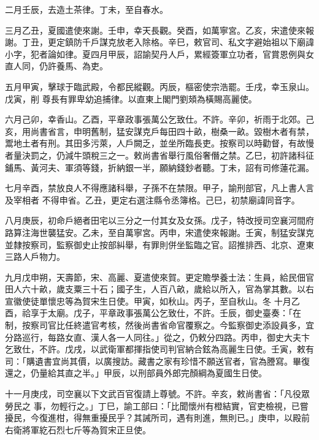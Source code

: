 \begin{pinyinscope}
 二月壬辰，去造土茶律。丁未，至自春水。



 三月乙丑，夏國遣使來謝。壬申，幸天長觀。癸酉，如萬寧宮。乙亥，宋遣使來報謝。丁丑，更定鎮防千戶謀克放老入除格。辛巳，敕官司、私文字避始祖以下廟諱小字，犯者論如律。夏四月甲辰，詔諭契丹人戶，累經簽軍立功者，官賞恩例與女直人同，仍許養馬、為吏。



 五月甲寅，擊球于臨武殿，令都民縱觀。丙辰，樞密使宗浩罷。壬戌，幸玉泉山。戊寅，削
 尊長有罪卑幼追捕律。以直東上閣門劉頍為橫賜高麗使。



 六月己卯，幸香山。乙酉，平章政事張萬公乞致仕。不許。辛卯，祈雨于北郊。己亥，用尚書省言，申明舊制，猛安謀克戶每田四十畝，樹桑一畝。毀樹木者有禁，鬻地土者有刑。其田多污萊，人戶闕乏，並坐所臨長吏。按察司以時勸督，有故慢者量決罰之，仍減牛頭稅三之一。敕尚書省舉行風俗奢僭之禁。乙巳，初許諸科征鋪馬、黃河夫、軍須等錢，折納銀一半，願納錢鈔者聽。丁未，詔有司修蓮花漏。



 七月辛酉，禁放良人不得應諸科舉，子孫不在禁限。甲子，諭刑部官，凡上書人言及宰相者
 不得申省。乙丑，更定右選注縣令丞簿格。己巳，初禁廟諱同音字。



 八月庚辰，初命戶絕者田宅以三分之一付其女及女孫。戊子，特改授司空襄河間府路算注海世襲猛安。乙未，至自萬寧宮。丙申，宋遣使來報謝。壬寅，制猛安謀克並隸按察司，監察御史止按部糾舉，有罪則併坐監臨之官。詔推排西、北京、遼東三路人戶物力。



 九月戊申朔，天壽節，宋、高麗、夏遣使來賀。更定贍學養士法：生員，給民佃官田人六十畝，歲支粟三十石；國子生，人百八畝，歲給以所入，官為掌其數。以右宣徽使徒單懷忠等為賀宋生日使。甲寅，如秋山。丙子，至自秋山。冬
 十月乙酉，祫享于太廟。戊子，平章政事張萬公乞致仕，不許。壬辰，御史臺奏：「在制，按察司官比任終遣官考核，然後尚書省命官覆察之。今監察御史添設員多，宜分路巡行，每路女直、漢人各一人同往。」從之，仍敕分四路。丙申，御史大夫卞乞致仕，不許。戊戌，以武衛軍都揮指使司判官納合鉉為高麗生日使。壬寅，敕有司：「購遺書宜尚其價，以廣搜訪。藏書之家有珍惜不願送官者，官為謄寫。畢復還之，仍量給其直之半。」甲辰，以刑部員外郎完顏綱為夏國生日使。



 十一月庚戌，司空襄以下文武百官復請上尊號。不許。辛亥，敕尚書省：「凡役眾勞民之
 事，勿輕行之。」丁巳，諭工部曰：「比聞懷州有橙結實，官吏檢視，已嘗擾民，今復進柑，得無重擾民乎？其誡所司，遇有則進，無則已。」庚申，以殿前右衛將軍紇石烈七斤等為賀宋正旦使。




\end{pinyinscope}

